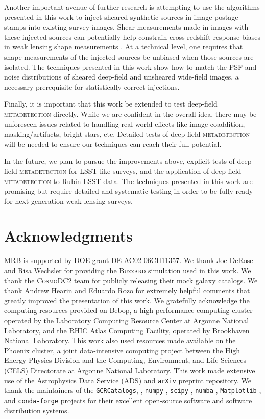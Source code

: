 \documentclass[twocolumn]{openjournal}
\makeatletter
\newcommand{\mdet}{\textsc{metadetection}\@\xspace}
\newcommand{\cosmodctwo}{\textsc{CosmoDC2}\@\xspace}
\newcommand{\buzzard}{\textsc{Buzzard}\@\xspace}
\makeatother
\begin{document}
Another important avenue of further research is attempting to use the algorithms
presented in this work to inject sheared synthetic sources in image postage stamps into
existing survey images. Shear measurements made in images with these injected sources
can potentially help constrain cross-redshift response biases in weak lensing shape
measurements \citep{desy3imsims}. At a technical level, one requires that shape
measurements of the injected sources be unbiased when those sources are isolated. The
techniques presented in this work show how to match the PSF and noise distributions of
sheared deep-field and unsheared wide-field images, a necessary prerequisite for
statistically correct injections.

Finally, it is important that this work be extended to test deep-field \mdet directly.
While we are confident in the overall idea, there may be unforeseen issues related to
handling real-world effects like image coaddition, masking/artifacts, bright stars, etc.
Detailed tests of deep-field \mdet will be needed to ensure our techniques can reach
their full potential.

In the future, we plan to pursue the improvements above, explicit tests of deep-field
\mdet for LSST-like surveys, and the application of deep-field \mdet to Rubin LSST data.
The techniques presented in this work are promising but require detailed and systematic
testing in order to be fully ready for next-generation weak lensing surveys.

\section*{Acknowledgments}

MRB is supported by DOE grant DE-AC02-06CH11357. We thank Joe DeRose and Risa Wechsler
for providing the \buzzard simulation used in this work. We thank the \cosmodctwo team
for publicly releasing their mock galaxy catalogs. We thank Andrew Hearin and Eduardo
Rozo for extremely helpful comments that greatly improved the presentation of this work.
We gratefully acknowledge the computing resources provided on Bebop, a high-performance
computing cluster operated by the Laboratory Computing Resource Center at Argonne
National Laboratory, and the RHIC Atlas Computing Facility, operated by Brookhaven
National Laboratory. This work also used resources made available on the Phoenix
cluster, a joint data-intensive computing project between the High Energy Physics
Division and the Computing, Environment, and Life Sciences (CELS) Directorate at Argonne
National Laboratory. This work made extensive use of the Astrophysics Data Service (ADS)
and \texttt{arXiv} preprint repository. We thank the maintainers of the
\texttt{GCRCatalogs}, \citep{gcrcatalogs}, \texttt{numpy} \citep{numpy}, \texttt{scipy}
\citep{scipy}, \texttt{numba} \citep{numba}, \texttt{Matplotlib} \citep{matplotlib}, and
\texttt{conda-forge} \citep{condaforge} projects for their excellent open-source
software and software distribution systems.




\end{document}

